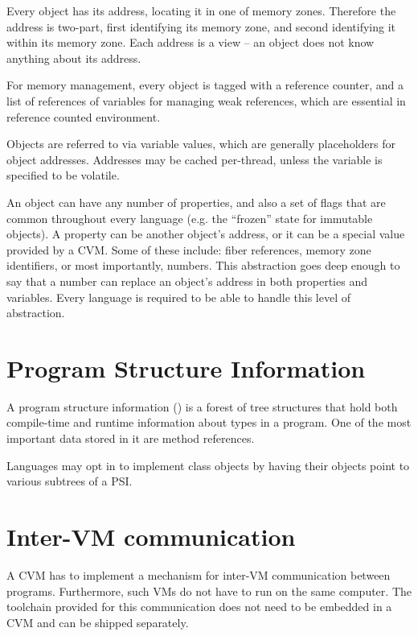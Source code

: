 Every object has its address, locating it in one of memory zones. Therefore the address is two-part, first identifying its memory zone, and second identifying it within its memory zone. Each address is a view -- an object does not know anything about its address. 

For memory management, every object is tagged with a reference counter, and a list of references of variables for managing weak references, which are essential in reference counted environment. 

Objects are referred to via variable values, which are generally placeholders for object addresses. Addresses may be cached per-thread, unless the variable is specified to be volatile. 

An object can have any number of properties, and also a set of flags that are common throughout every language (e.g. the ``frozen'' state for immutable objects). A property can be another object's address, or it can be a special value provided by a CVM. Some of these include: fiber references, memory zone identifiers, or most importantly, numbers. This abstraction goes deep enough to say that a number can replace an object's address in both properties and variables. Every language is required to be able to handle this level of abstraction. 






\section{Program Structure Information}
\label{sec:psi}

A program structure information () is a forest of tree structures that hold both compile-time and runtime information about types in a program. One of the most important data stored in it are method references. 

Languages may opt in to implement class objects by having their objects point to various subtrees of a PSI. 





\section{Inter-VM communication} %

A CVM has to implement a mechanism for inter-VM communication between programs. Furthermore, such VMs do not have to run on the same computer. The toolchain provided for this communication does not need to be embedded in a CVM and can be shipped separately. 

